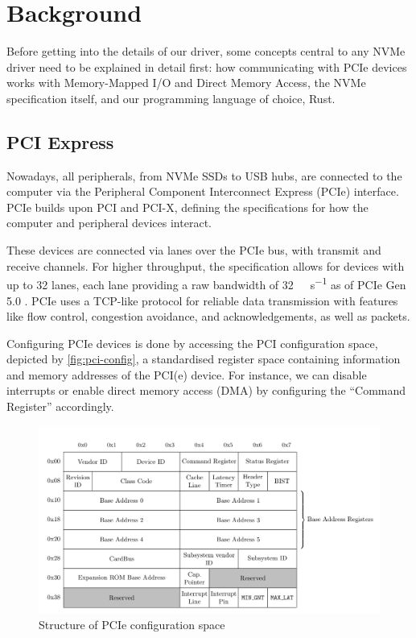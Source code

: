 \chapter{Background}\label{chapter:basics}

Before getting into the details of our driver, some concepts central to any NVMe driver need to be explained in detail first: how communicating with PCIe devices works with Memory-Mapped I/O and Direct Memory Access, the NVMe specification itself, and our programming language of choice, Rust.

\section{PCI Express}
Nowadays, all peripherals, from NVMe SSDs to USB hubs, are connected to the computer via the Peripheral Component Interconnect Express (PCIe) interface. PCIe builds upon PCI and PCI-X, defining the specifications for how the computer and peripheral devices interact.

These devices are connected via lanes over the PCIe bus, with transmit and receive channels. For higher throughput, the specification allows for devices with up to 32 lanes, each lane providing a raw bandwidth of \qty[per-mode=symbol]{32}{\giga\bit\per\second} as of PCIe Gen 5.0 \cite{pcie}. PCIe uses a TCP-like protocol for reliable data transmission with features like flow control, congestion avoidance, and acknowledgements, as well as packets.

Configuring PCIe devices is done by accessing the PCI configuration space, depicted by \autoref{fig:pci-config}, a standardised register space containing information and memory addresses of the PCI(e) device. For instance, we can disable interrupts or enable direct memory access (DMA) by configuring the ``Command Register'' accordingly.

\begin{figure}[H]
  \centering
    \includegraphics[width=\textwidth]{figures/pcie-config-space}
    \caption{Structure of PCIe configuration space}
    \label{fig:pci-config}
\end{figure}

